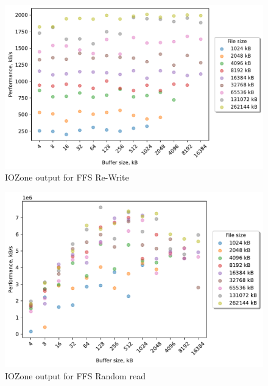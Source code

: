 \begin{figure}[!htb]
	\label{fig:bench_ffs_re_write}
	\begin{center}
		\includegraphics[width=1.0\textwidth]{figures/benchmarking/ffs/Re-Write.pdf}
	\end{center}
	\caption{IOZone output for FFS \mbox{Re-Write}}
\end{figure}

\begin{figure}[!htb]
	\label{fig:bench_ffs_rnd_read}
	\begin{center}
		\includegraphics[width=1.0\textwidth]{figures/benchmarking/ffs/Random read.pdf}
	\end{center}
	\caption{IOZone output for FFS Random read}
\end{figure}

